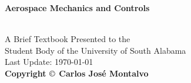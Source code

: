 \documentclass{article}
\begin{document}
\begin{center}
\begin{LARGE}{\bf Aerospace Mechanics and Controls}\end{LARGE}\\
\large
\vspace{22 mm}
   A Brief Textbook Presented to the \\ 
   Student Body of the University of South Alabama \\
\vspace{22 mm}
\vspace{22 mm}
\vspace{22 mm}
Last Update: \today\\
{\bf Copyright $\copyright$ Carlos Jos\'{e} Montalvo}
\end{center}



\linespread{1}

\newpage





\end{document}
